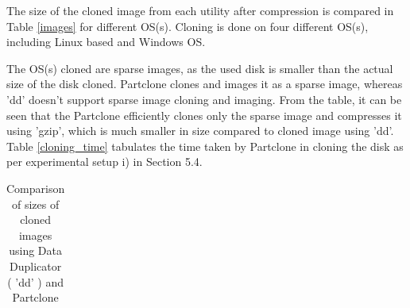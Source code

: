\documentclass[a4paper,12pt]{article}
\begin{document}
The size of the cloned image from each utility after compression is compared in Table \ref{images} for different OS(s). Cloning is done on four different OS(s), including Linux based and Windows OS. 

The OS(s) cloned are sparse images, as the used disk is smaller than the actual size of the disk cloned. Partclone clones and images it as a sparse image, whereas 'dd' doesn't support sparse image cloning and imaging. From the table, it can be seen that the Partclone efficiently clones only the sparse image and compresses it using 'gzip', which is much smaller in size compared to cloned image using 'dd'. Table \ref{cloning_time} tabulates the time taken by Partclone in cloning the disk as per experimental setup i) in Section 5.4.


\begin{table}[H]
\centering
\caption {Comparison of sizes of cloned images using Data Duplicator ( 'dd' ) and Partclone} 
\label{cloning_tools} 
\begin{center}
\begin{tabular}{|c|c|c|l|l|}


\end{tabular}
\end{center}
\end{table}
\end{document}
